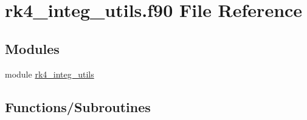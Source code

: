 \hypertarget{rk4__integ__utils_8f90}{}\section{rk4\+\_\+integ\+\_\+utils.\+f90 File Reference}
\label{rk4__integ__utils_8f90}
\subsection*{Modules}
\begin{DoxyCompactItemize}
\item 
module \hyperlink{namespacerk4__integ__utils}{rk4\+\_\+integ\+\_\+utils}
\end{DoxyCompactItemize}
\subsection*{Functions/\+Subroutines}

